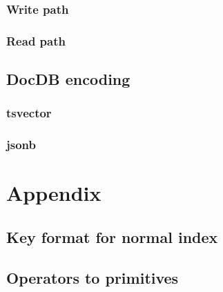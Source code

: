 \documentclass[11pt]{article}
\begin{document}
\hypertarget{write-path}{%
\subsubsection{Write path}\label{write-path}}

\hypertarget{read-path}{%
\subsubsection{Read path}\label{read-path}}

\hypertarget{docdb-encoding}{%
\subsection{DocDB encoding}\label{docdb-encoding}}

\hypertarget{tsvector}{%
\subsubsection{tsvector}\label{tsvector}}

\hypertarget{jsonb}{%
\subsubsection{jsonb}\label{jsonb}}

\hypertarget{appendix}{%
\section{Appendix}\label{appendix}}

\hypertarget{key-format-for-normal-index}{%
\subsection{Key format for normal
index}\label{key-format-for-normal-index}}

\hypertarget{operators-to-primitives}{%
\subsection{Operators to primitives}\label{operators-to-primitives}}
\end{document}
